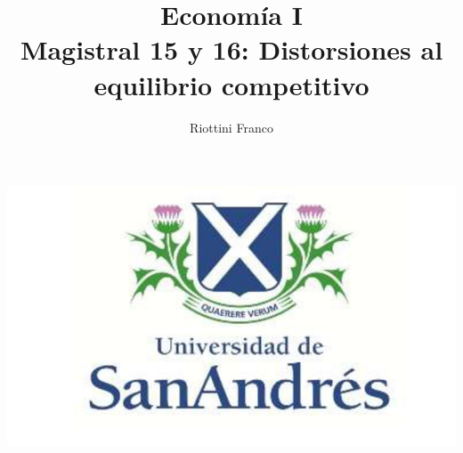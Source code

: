 \documentclass{beamer}
\title[Economía I]{Economía I \vspace{4mm}
\\ Magistral 15 y 16: Distorsiones al equilibrio competitivo}
\date{}
\author[Franco Riottini]{Riottini Franco}
\institute[]{Universidad de San Andrés}
\begin{document}
\begin{frame}
\titlepage
\centering
\includegraphics[scale=0.2]{../Figures/logoUDESA.jpg} 
\end{frame}
\end{document}
